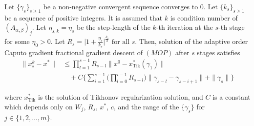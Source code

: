 \documentclass[10pt,a4paper]{amsart}
\begin{document}
\begin{theorem}\label{thm6}
Let $\{\gamma_s\}_{s \geq 1}$ be a non-negative convergent sequence converges to $0$. Let $\{k_s\}_{s \geq 1}$ be a sequence of positive integers. It is assumed that $k$ is  condition number of $(A_{\alpha,\beta})_j$. Let $\eta_{s,k}= \eta_s$ be the step-length of the $k$-th iteration at the $s$-th stage for some $\eta_0 > 0$. Let
\(
R_s = \Big| 1 + \frac{\eta_s}{k_s} \Big|^\frac{k_s}{2} \text{ for all } s.
\) Then, solution of the adaptive order Caputo gradient fractional gradient descent of $(MOP)$ after $s$ stages satisfies
\begin{align*}
\Big\| x_s^{k} - x^* \Big\|
&\leq \prod_{l=1}^{s-1} R_{s-l} \Big\| x^{0} - x^*_{\text{Tik}}(\gamma_1) \Big\| \\
&\quad + C \Big\{ \sum_{i=1}^{s-1} \Big( \prod_{l=0}^{i-1} R_{s-l} \Big) \Big\| \gamma_{s-l} - \gamma_{s-i+1} \Big\| + \|\gamma_s\| \Big\}
\end{align*}


where $x^*_{\text{Tik}}$ is the solution of Tikhonov regularization solution, and $C$ is a constant which depends only on $W_j$, $R_s$, $x^*$, $c$, and the range of the $\{\gamma_s\}$ for $j\in\{1,2,\dots,m\}.$


\end{theorem}
\end{document}
